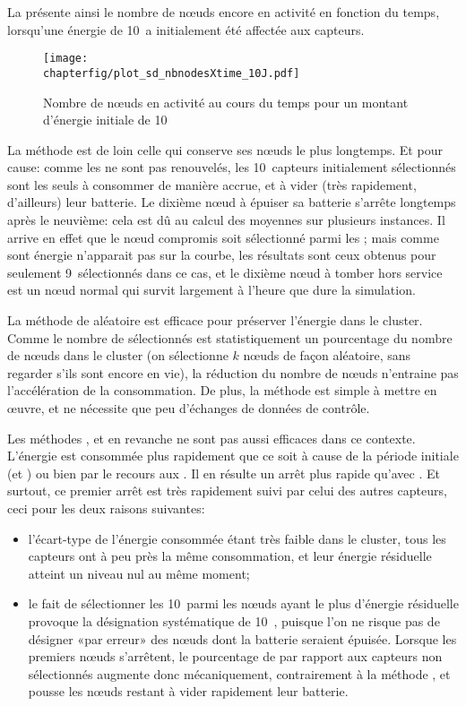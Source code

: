 La  présente ainsi le nombre de nœuds encore en activité en fonction du temps, lorsqu'une énergie de 10~\joule a initialement été affectée aux capteurs.
\begin{figure}[!b]
    \centering
    \texttt{[image: \\chapterfig/plot\_sd\_nbnodesXtime\_10J.pdf]}
    \caption{Nombre de nœuds en activité au cours du temps pour un montant d'énergie initiale de 10~\joule}\label{sd:fig:nbnodes-10J}
\end{figure}
La méthode \idstat est de loin celle qui conserve ses nœuds le plus longtemps.
Et pour cause: comme les \cns ne sont pas renouvelés, les 10~capteurs initialement sélectionnés sont les seuls à consommer de manière accrue, et à vider (très rapidement, d'ailleurs) leur batterie.
Le dixième nœud à épuiser sa batterie s'arrête longtemps après le neuvième: cela est dû au calcul des moyennes sur plusieurs instances.
Il arrive en effet que le nœud compromis soit sélectionné parmi les \cns; mais comme sont énergie n'apparait pas sur la courbe, les résultats sont ceux obtenus pour seulement 9~\cns sélectionnés dans ce cas, et le dixième nœud à tomber hors service est un nœud normal qui survit largement à l'heure que dure la simulation.

La méthode de  aléatoire \idrand est efficace pour préserver l'énergie dans le cluster.
Comme le nombre de \cns sélectionnés est statistiquement un pourcentage du nombre de nœuds dans le cluster (on sélectionne $k$ nœuds de façon aléatoire, sans regarder s'ils sont encore en vie), la réduction du nombre de nœuds n'entraine pas l'accélération de la consommation.
De plus, la méthode est simple à mettre en œuvre, et ne nécessite que peu d'échanges de données de contrôle.

Les méthodes \ideres, \iddemx et \iddems en revanche ne sont pas aussi efficaces dans ce contexte.
L'énergie est consommée plus rapidement que ce soit à cause de la période initiale (\iddemx et \iddems) ou bien par le recours aux \vns.
Il en résulte un arrêt plus rapide qu'avec \idrand.
Et surtout, ce premier arrêt est très rapidement suivi par celui des autres capteurs, ceci pour les deux raisons suivantes:
\begin{itemize}
    \item l'écart-type de l'énergie consommée étant très faible dans le cluster, tous les capteurs ont à peu près la même consommation, et leur énergie résiduelle atteint un niveau nul au même moment;
    \item le fait de sélectionner les 10~\cns parmi les nœuds ayant le plus d'énergie résiduelle provoque la désignation systématique de 10~\cns, puisque l'on ne risque pas de désigner «par erreur» des nœuds dont la batterie seraient épuisée. Lorsque les premiers nœuds s'arrêtent, le pourcentage de \cns par rapport aux capteurs non sélectionnés augmente donc mécaniquement, contrairement à la méthode \idrand, et pousse les nœuds restant à vider rapidement leur batterie.
\end{itemize}

